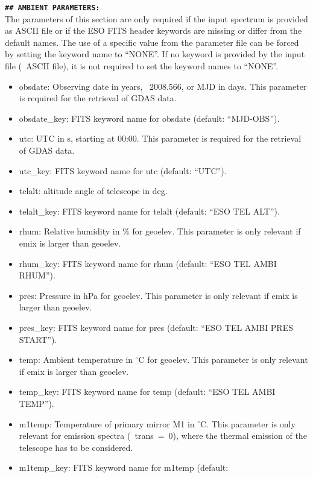 {\bf\large\tt\#\# AMBIENT PARAMETERS:}\\[0.5cm]
The parameters of this section are only required if the input spectrum is
provided as ASCII file or if the ESO FITS header keywords are missing or differ
from the default names. The use of a specific value from the parameter file can
be forced by setting the keyword name to ``NONE''. If no keyword is provided
by the input file (\eg\ ASCII file), it is not required to set the keyword
names to ``NONE''.
\begin{itemize}
\item {\sc obsdate}: Observing date in years, \eg\ 2008.566, or MJD in days.
This parameter is required for the retrieval of GDAS data.
\item {\sc obsdate\_key}: FITS keyword name for {\sc obsdate} (default:
``MJD-OBS'').
\item {\sc utc}: UTC in s, starting at 00:00. This parameter is required for
the retrieval of GDAS data.
\item {\sc utc\_key}: FITS keyword name for {\sc utc} (default: ``UTC'').
\item {\sc telalt}: altitude angle of telescope in deg.
\item {\sc telalt\_key}: FITS keyword name for {\sc telalt} (default:
``ESO TEL ALT'').
\item {\sc rhum}: Relative humidity in \% for {\sc geoelev}. This parameter is
only relevant if {\sc emix} is larger than {\sc geoelev}.
\item {\sc rhum\_key}: FITS keyword name for {\sc rhum} (default:
``ESO TEL AMBI RHUM'').
\item {\sc pres}: Pressure in hPa for {\sc geoelev}. This parameter is only
relevant if {\sc emix} is larger than {\sc geoelev}.
\item {\sc pres\_key}: FITS keyword name for {\sc pres} (default:
``ESO TEL AMBI PRES START'').
\item {\sc temp}: Ambient temperature in $^\circ$C for {\sc geoelev}. This
parameter is only relevant if {\sc emix} is larger than {\sc geoelev}.
\item {\sc temp\_key}: FITS keyword name for {\sc temp} (default:
``ESO TEL AMBI TEMP'').
\item {\sc m1temp}: Temperature of primary mirror M1 in $^\circ$C. This
parameter is only relevant for emission spectra (\ie\ {\sc trans}~=~0), where
the thermal emission of the telescope has to be considered.
\item {\sc m1temp\_key}: FITS keyword name for {\sc m1temp} (default:

\end{itemize}
